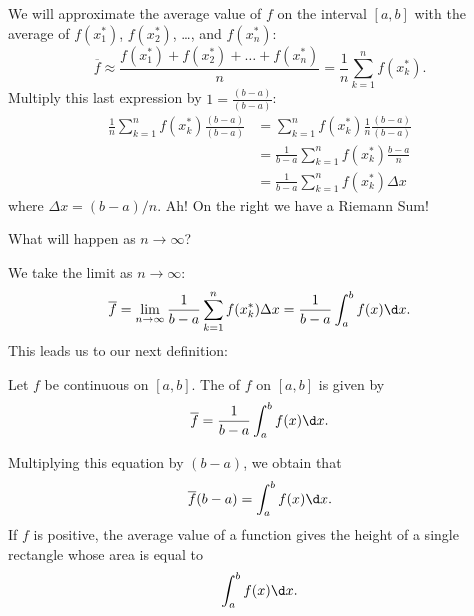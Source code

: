 \documentclass{ximera}
\begin{document}
We will approximate the average value of $f$ on the interval $[a,b]$ with the average of $f(x_1^*)$,
$f(x_2^*)$, \dots, and  $f(x_n^*)$:
\[
\overline{f}\approx\frac{f(x_1^*) + f(x_2^*) + \dots + f(x_n^*)}{n} = \frac1n\sum_{k=1}^n f(x_k^*).
\]
Multiply this last expression by $1 = \frac{(b-a)}{(b-a)}$:
\begin{align*}
  \frac1n \sum_{k=1}^n f(x_k^*)\frac{(b-a)}{(b-a)} &= \sum_{k=1}^n f(x_k^*)\frac1n \frac{(b-a)}{(b-a)} \\
  &= \frac{1}{b-a} \sum_{k=1}^n f(x_k^*)\frac{b-a}n  \\
  &=\frac{1}{b-a} \sum_{k=1}^n f(x_k^*)\Delta x
\end{align*}
where $\Delta x = (b-a)/n$.  Ah! On the right we have a Riemann Sum!

What will happen  as $n\to\infty$?

We take the limit as $n\to\infty$:
\[
\overline{f}=\lim_{n\to\infty} \frac{1}{b-a} \sum_{k=1}^n f(x_k^*)\Delta x = \frac{1}{b-a} \int_a^b f(x)\d x.
\]
This leads us to our next definition:

\begin{definition}
  Let $f$ be continuous on $[a,b]$. The  of $f$ on
  $[a,b]$ is given by
  \[
\overline{f}=  \frac{1}{b-a}\int_a^b f(x)\d x.
  \]
\end{definition}
Multiplying this equation by $(b-a)$, we obtain that 
 \[
\overline{f}(b-a)= \int_a^b f(x)\d x.
  \]
If $f$ is positive,  the average value of a function gives the  height of a single rectangle whose  area is equal to
\[
\int_a^b f(x) \d x.
\]
\begin{image}
\end{image}
\end{document}
